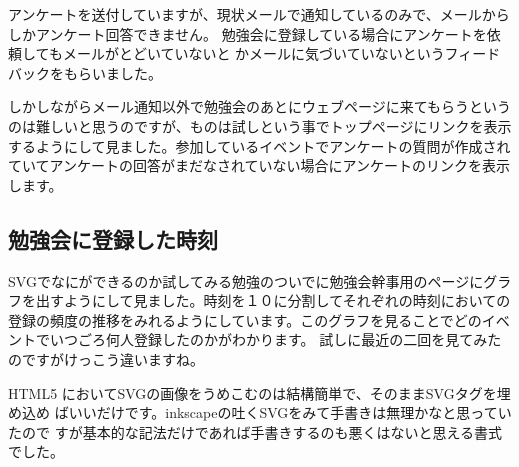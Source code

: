 \documentclass[mingoth,a4paper]{jsarticle}
\begin{document}
アンケートを送付していますが、現状メールで通知しているのみで、メールから
しかアンケート回答できません。
勉強会に登録している場合にアンケートを依頼してもメールがとどいていないと
かメールに気づいていないというフィードバックをもらいました。

しかしながらメール通知以外で勉強会のあとにウェブページに来てもらうという
のは難しいと思うのですが、ものは試しという事でトップページにリンクを表示
するようにして見ました。参加しているイベントでアンケートの質問が作成され
ていてアンケートの回答がまだなされていない場合にアンケートのリンクを表示
します。


\subsection{勉強会に登録した時刻}

SVGでなにができるのか試してみる勉強のついでに勉強会幹事用のページにグラ
フを出すようにして見ました。時刻を１０に分割してそれぞれの時刻においての
登録の頻度の推移をみれるようにしています。このグラフを見ることでどのイベ
ントでいつごろ何人登録したのかがわかります。
試しに最近の二回を見てみたのですがけっこう違いますね。

HTML5 においてSVGの画像をうめこむのは結構簡単で、そのままSVGタグを埋め込め
ばいいだけです。inkscapeの吐くSVGをみて手書きは無理かなと思っていたので
すが基本的な記法だけであれば手書きするのも悪くはないと思える書式でした。

\end{document}
